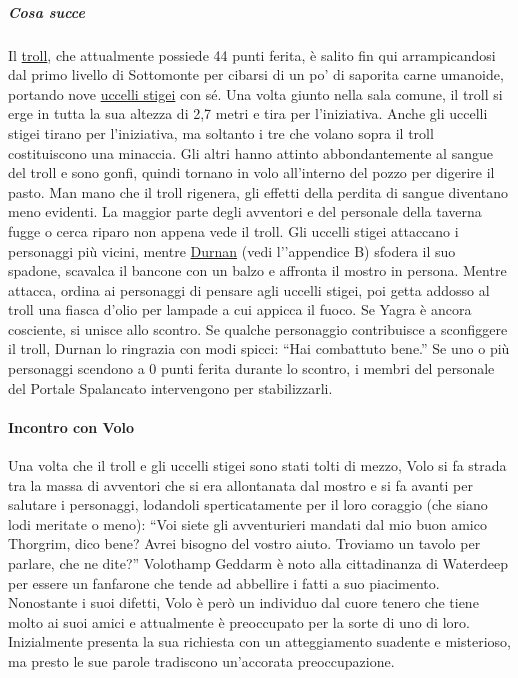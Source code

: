 \documentclass{article}
\begin{document}
\subparagraph{Cosa succe}
Il \hyperlink{troll}{ troll}, che attualmente possiede 44 punti ferita, è salito
fin qui arrampicandosi dal primo livello di Sottomonte per
cibarsi di un po' di saporita carne umanoide, portando nove
\hyperlink{uccelli}{uccelli stigei} con sé. Una volta giunto nella sala comune,
il troll si erge in tutta la sua altezza di 2,7 metri e tira per
l'iniziativa. Anche gli uccelli stigei tirano per l'iniziativa,
ma soltanto i tre che volano sopra il troll costituiscono una
minaccia. Gli altri hanno attinto abbondantemente al sangue
del troll e sono gonfi, quindi tornano in volo all’interno del
pozzo per digerire il pasto. Man mano che il troll rigenera,
gli effetti della perdita di sangue diventano meno evidenti.
La maggior parte degli avventori e del personale della
taverna fugge o cerca riparo non appena vede il troll. Gli
uccelli stigei attaccano i personaggi più vicini, mentre
\hyperlink{Duran}{Durnan} (vedi l'’appendice B) sfodera il suo spadone,
scavalca il bancone con un balzo e affronta il mostro in
persona. Mentre attacca, ordina ai personaggi di pensare
agli uccelli stigei, poi getta addosso al troll una fiasca d'olio
per lampade a cui appicca il fuoco. Se Yagra è ancora
cosciente, si unisce allo scontro. Se qualche personaggio
contribuisce a sconfiggere il troll, Durnan lo ringrazia con
modi spicci: “Hai combattuto bene.”
Se uno o più personaggi scendono a 0 punti ferita
durante lo scontro, i membri del personale del Portale
Spalancato intervengono per stabilizzarli.

\paragraph{Incontro con Volo} 
Una volta che il troll e gli uccelli stigei sono stati tolti di
mezzo, Volo si fa strada tra la massa di avventori che si
era allontanata dal mostro e si fa avanti per salutare i
personaggi, lodandoli sperticatamente per il loro coraggio
(che siano lodi meritate o meno): “Voi siete gli avventurieri mandati dal mio buon amico Thorgrim,
dico bene? Avrei bisogno del vostro aiuto. Troviamo un
tavolo per parlare, che ne dite?”
Volothamp Geddarm è noto alla cittadinanza di
Waterdeep per essere un fanfarone che tende ad abbellire
i fatti a suo piacimento. Nonostante i suoi difetti, Volo
è però un individuo dal cuore tenero che tiene molto ai
suoi amici e attualmente è preoccupato per la sorte di
uno di loro. Inizialmente presenta la sua richiesta con un
atteggiamento suadente e misterioso, ma presto le sue
parole tradiscono un’accorata preoccupazione.
\end{document}
